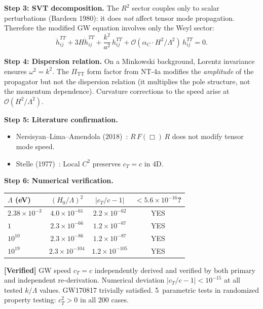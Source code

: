 \documentclass[11pt,a4paper]{article}
\theoremstyle{plain}
\theoremstyle{definition}
\newcommand{\verified}[1]{%
  \par\smallskip\noindent
  \colorbox{green!10}{\parbox{\dimexpr\linewidth-2\fboxsep}{%
    \textcolor{green!50!black}{\textbf{[Verified]}} #1}}%
  \par\smallskip}
\begin{document}
\textbf{Step 3: SVT decomposition.}
The $R^2$ sector couples only to scalar perturbations (Bardeen 1980):
it does \emph{not} affect tensor mode propagation. Therefore the
modified GW equation involves only the Weyl sector:
\begin{equation}\label{eq:gw-eq}
  \ddot{h}_{ij}^{TT} + 3H\dot{h}_{ij}^{TT}
  + \frac{k^2}{a^2}\,h_{ij}^{TT}
  + \mathcal{O}(\alpha_C\cdot H^2/\Lambda^2)\,h_{ij}^{TT} = 0.
\end{equation}

\textbf{Step 4: Dispersion relation.}
On a Minkowski background, Lorentz invariance ensures
$\omega^2 = k^2$. The $\Pi_{\mathrm{TT}}$ form factor from NT-4a
modifies the \emph{amplitude} of the propagator but not the
dispersion relation (it multiplies the pole structure, not the
momentum dependence). Curvature corrections to the speed arise at
$\mathcal{O}(H^2/\Lambda^2)$.

\textbf{Step 5: Literature confirmation.}
\begin{itemize}[nosep]
  \item Nersisyan--Lima--Amendola (2018)~\cite{NLA18}: $R\,F(\Box)\,R$
    does not modify tensor mode speed.
  \item Stelle (1977)~\cite{Ste77}: Local $C^2$ preserves $c_T = c$ in 4D.
\end{itemize}

\textbf{Step 6: Numerical verification.}

\begin{center}
\begin{tabular}{lccc}
\toprule
$\Lambda$ (eV) & $(H_0/\Lambda)^2$ & $|c_T/c - 1|$ & $< 5.6\times 10^{-16}$? \\
\midrule
$2.38\times 10^{-3}$ & $4.0\times 10^{-61}$ & $2.2\times 10^{-62}$ & YES \\
$1$ & $2.3\times 10^{-66}$ & $1.2\times 10^{-67}$ & YES \\
$10^{10}$ & $2.3\times 10^{-86}$ & $1.2\times 10^{-87}$ & YES \\
$10^{19}$ & $2.3\times 10^{-104}$ & $1.2\times 10^{-105}$ & YES \\
\bottomrule
\end{tabular}
\end{center}

\verified{GW speed $c_T = c$ independently derived and verified by
both primary and independent re-derivation. Numerical deviation $|c_T/c - 1| < 10^{-15}$
at all tested $k/\Lambda$ values. GW170817 trivially satisfied.
5~parametric tests in randomized property testing: $c_T^2 > 0$ in all 200 cases.}
\end{document}
